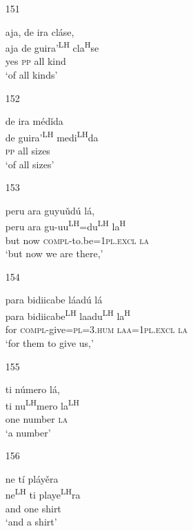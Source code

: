 \begin{itemize}
\item[151]
 
\glll   aja, de ira cl\'{a}se, \\
 aja de guira'\textsuperscript{LH} cla\textsuperscript{H}se\\
yes \textsc{pp} all kind\\
\glt `of all kinds'
 



\item[152]
 
\glll   de ira m\'{e}d\v{i}da \\
 de guira'\textsuperscript{LH} medi\textsuperscript{LH}da\\
\textsc{pp} all sizes\\
\glt `of all sizes'
 



\item[153]
 
\glll   peru ara guyu\v{u}d\'{u} l\'{a}, \\
peru ara gu-uu\textsuperscript{LH}=du\textsuperscript{LH} la\textsuperscript{H} \\
but now \textsc{compl}-to.be=\textsc{1pl.excl} \textsc{la}\\
\glt `but now we are there,'
 


\item[154]
 
\glll   para bidiicabe l\'{a}ad\'{u} l\'{a}\\
para bidiicabe\textsuperscript{LH} laadu\textsuperscript{LH} la\textsuperscript{H}\\
for \textsc{compl}-give=\textsc{pl}=\textsc{3.hum} \textsc{laa}=\textsc{1pl.excl} \textsc{la}\\
\glt `for them to give us,'
 



\item[155]
 
\glll   ti n\'{u}mero l\'{a}, \\
ti nu\textsuperscript{LH}mero la\textsuperscript{LH}\\
one number \textsc{la}\\
\glt `a number'
 


\item[156]
 
\glll   ne t\'{i} pl\'{a}y\v{e}ra\\
ne\textsuperscript{LH} ti playe\textsuperscript{LH}ra\\
and one shirt\\
\glt `and a shirt'
 



\end{itemize}
